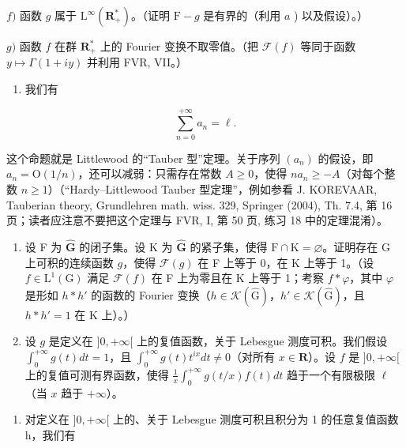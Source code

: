 \(f)\) 函数 \(g\) 属于 \(\mathrm{L}^{\infty}(\mathbf{R}_{+}^{*})\)。（证明 \(\mathrm{F}-g\) 是有界的（利用 \(a\) ) 以及假设）。）

\(g)\) 函数 \(f\) 在群 \(\mathbf{R}_{+}^{*}\) 上的 Fourier 变换不取零值。（把 \(\mathcal{F}(f)\) 等同于函数 \(y\mapsto\Gamma(1+iy)\) 并利用 FVR, VII。）

\begin{enumerate}
\def\labelenumi{\alph{enumi})}
\setcounter{enumi}{7}
\tightlist
\item
  我们有
\end{enumerate}

\[
\sum_ {n = 0} ^ {+ \infty} a _ {n} = \ell .
\]

这个命题就是 Littlewood 的“Tauber 型”定理。关于序列 \((a_n)\) 的假设，即 \(a_n = \mathrm{O}(1/n)\)，还可以减弱：只需存在常数 \(A \geqslant 0\)，使得 \(na_n \geqslant -A\)（对每个整数 \(n \geqslant 1\)）（“Hardy–Littlewood Tauber 型定理”，例如参看 J. KOREVAAR, Tauberian theory, Grundlehren math. wiss. 329, Springer (2004), Th. 7.4, 第 16 页；读者应注意不要把这个定理与 FVR, I, 第 50 页, 练习 18 中的定理混淆）。

\begin{enumerate}
\def\labelenumi{\arabic{enumi})}
\setcounter{enumi}{1}
\item
  设 F 为 \(\widehat{\mathbf{G}}\) 的闭子集。设 K 为 \(\widehat{\mathbf{G}}\) 的紧子集，使得 \(\mathrm{F} \cap \mathrm{K} = \varnothing\)。证明存在 G 上可积的连续函数 \(g\)，使得 \(\mathcal{F}(g)\) 在 F 上等于 0，在 K 上等于 1。（设 \(f \in \mathrm{L}^{1}(\mathrm{G})\) 满足 \(\mathcal{F}(f)\) 在 F 上为零且在 K 上等于 1；考察 \(f * \varphi\)，其中 \(\varphi\) 是形如 \(h * h'\) 的函数的 Fourier 变换（\(h \in \mathcal{K}(\widehat{\mathrm{G}})\)，\(h' \in \mathcal{K}(\widehat{\mathrm{G}})\)，且 \(h * h' = 1\) 在 K 上）。）
\item
  设 \(g\) 是定义在 \(]0, +\infty[\) 上的复值函数，关于 Lebesgue 测度可积。我们假设 \(\int_0^{+\infty} g(t)dt = 1\)，且 \(\int_0^{+\infty} g(t)t^{ix}dt \neq 0\)（对所有 \(x \in \mathbf{R}\)）。设 \(f\) 是 \(]0, +\infty[\) 上的复值可测有界函数，使得 \(\frac{1}{x}\int_0^{+\infty} g(t/x)f(t)dt\) 趋于一个有限极限 \(\ell\)（当 \(x\) 趋于 \(+\infty\)）。
\end{enumerate}

\begin{enumerate}
\def\labelenumi{\alph{enumi})}
\tightlist
\item
  对定义在 \(]0, +\infty[\) 上的、关于 Lebesgue 测度可积且积分为 1 的任意复值函数 h，我们有
\end{enumerate}


